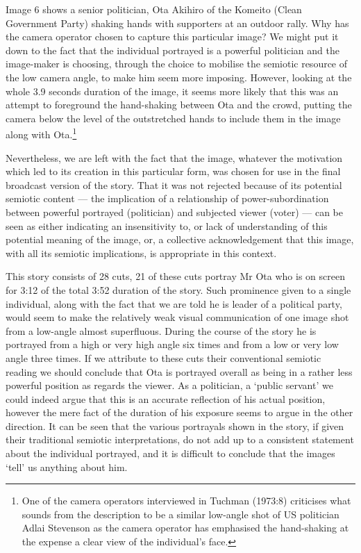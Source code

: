 \bigskip

Image 6 shows a senior politician, Ota Akihiro of the Komeito (Clean Government Party) shaking hands with supporters at an outdoor rally. Why has the camera operator chosen to capture this particular image? We might put it down to the fact that the individual portrayed is a powerful politician and the image-maker is choosing, through the choice to mobilise the semiotic resource of the low camera angle, to make him seem more imposing. However, looking at the whole 3.9 seconds duration of the image, it seems more likely that this was an attempt to foreground the hand-shaking between Ota and the crowd, putting the camera below the level of the outstretched hands to include them in the image along with Ota.\footnote{One of the camera operators interviewed in Tuchman (1973:8)\nocite{Tuchman:1973} criticises what sounds from the description to be a similar low-angle shot of US politician Adlai Stevenson as the camera operator has emphasised the hand-shaking at the expense a clear view of the individual's face.} 

Nevertheless, we are left with the fact that the image, whatever the motivation which led to its creation in this particular form, was chosen for use in the final broadcast version of the story. That it was not rejected because of its potential semiotic content --- the implication of a relationship of power-subordination between powerful portrayed (politician) and subjected viewer (voter) --- can be seen as either indicating an insensitivity to, or lack of understanding of this potential meaning of the image, or, a collective acknowledgement that this image, with all its semiotic implications, is appropriate in this context. 

This story consists of 28 cuts, 21 of these cuts portray Mr Ota who is on screen for 3:12 of the total 3:52 duration of the story. Such prominence given to a single individual, along with the fact that we are told he is leader of a political party, would seem to make the relatively weak visual communication of one image shot from a low-angle almost superfluous. During the course of the story he is portrayed from a high or very high angle six times and from a low or very low angle three times. If we attribute to these cuts their conventional semiotic reading we should conclude that Ota is portrayed overall as being in a rather less powerful position as regards the viewer. As a politician, a `public servant' we could indeed argue that this is an accurate reflection of his actual position, however the mere fact of the duration of his exposure seems to argue in the other direction. It can be seen that the various portrayals shown in the story, if given their traditional semiotic interpretations, do not add up to a consistent statement about the individual portrayed, and it is difficult to conclude that the images `tell' us anything about him.

